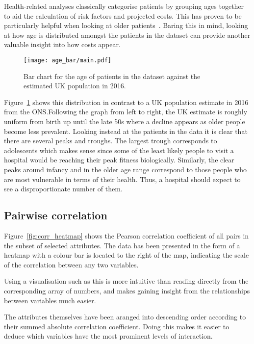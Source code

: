 Health-related analyses classically categorise patients by grouping ages
together to aid the calculation of risk factors and projected costs. This has
proven to be particularly helpful when looking at older
patients~\cite{Billings327}. Baring this in mind, looking at how age is
distributed amongst the patients in the dataset can provide another valuable
insight into how costs appear.

\begin{figure}[htbp]
    \centering
    \texttt{[image: age\_bar/main.pdf]}
    \caption{Bar chart for the age of patients in the dataset against the
        estimated UK population in 2016.}%
    \label{fig:age_bar}
\end{figure}

Figure~\ref{fig:age_bar} shows this distribution in contrast to a UK population
estimate in 2016 from the ONS.\@ Following the graph from left to right, the UK
estimate is roughly uniform from birth up until the late 50s where a decline
appears as older people become less prevalent. Looking instead at the patients
in the data it is clear that there are several peaks and troughs. The largest
trough corresponds to adolescents which makes sense since some of the least
likely people to visit a hospital would be reaching their peak fitness
biologically. Similarly, the clear peaks around infancy and in the older age
range correspond to those people who are most vulnerable in terms of their
health. Thus, a hospital should expect to see a disproportionate number of them.


\subsection{Pairwise correlation}\label{subsec:corr}

Figure~\ref{fig:corr_heatmap} shows the Pearson correlation coefficient of all
pairs in the subset of selected attributes. The data has been presented in the
form of a heatmap with a colour bar is located to the right of the map,
indicating the scale of the correlation between any two variables.

Using a visualisation such as this is more intuitive than reading directly from
the corresponding array of numbers, and makes gaining insight from the
relationships between variables much easier.

The attributes themselves have been aranged into descending order according to
their summed absolute correlation coefficient. Doing this makes it easier to
deduce which variables have the most prominent levels of interaction.

